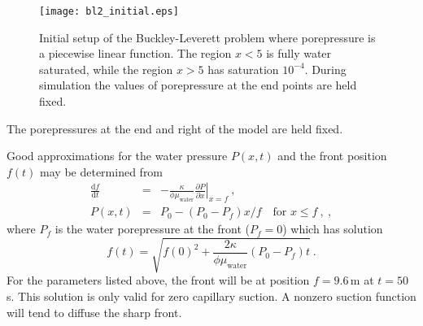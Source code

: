 \documentclass[]{scrreprt}
\begin{document}
\begin{figure}[htb]
\begin{center}
\texttt{[image: bl2\_initial.eps]}
\caption{Initial setup of the Buckley-Leverett problem where
  porepressure is a piecewise linear function.  The region
$x<5$ is fully water saturated, while the region $x>5$ has saturation
  $10^{-4}$.  During simulation the values of porepressure at the end
  points are held fixed.}
\label{bl2_setup.figa}
\end{center}
\end{figure}

The porepressures at the end and right of the model are held fixed.

Good approximations for the water pressure $P(x,t)$
and the front position $f(t)$ may be determined from
\begin{eqnarray}
\frac{{\mathrm d} f}{{\mathrm d} t} & = & -\frac{\kappa}{\phi\mu_{\mathrm{water}}}
\left.\frac{\partial  P}{\partial x}\right|_{x = f} \ , \nonumber \\
P(x,t) & = & P_{0} - (P_{0}-P_{f})x/f \ \ \ \mbox{ for } x\leq f  \ ,
\ ,
\label{eqn.predicted.bl2.posn.eqna}
\end{eqnarray}
where $P_{f}$ is the water porepressure at the front ($P_{f}=0$)
which has solution
\begin{equation}
f(t) = \sqrt{f(0)^{2} + \frac{2\kappa}{\phi\mu_{\mathrm{water}}}(P_{0}-P_{f})t} \ .
\end{equation}
For the parameters listed above, the front will be at position
$f=9.6$\,m at $t=50$\,s.  This solution is only valid for zero
capillary suction.  A nonzero suction function will tend to diffuse
the sharp front.
\end{document}
